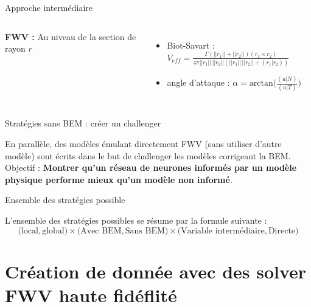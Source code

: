 \documentclass[
11pt,notheorems,hyperref={pdfauthor=whatever}
]{beamer}
\begin{document}
\begin{frame}{Approche intermédiaire}
\begin{center}
\begin{columns}[c]
        \centering

        \textbf{FWV :}
        Au niveau de la section de rayon $r$ 
        \begin{itemize}\small
            \item Biot-Savart :  $V_{eff} = \frac{\Gamma(||r_1|| + ||r_2||)(r_1 \times r_2)}{4\pi ||r_1|| \, ||r_2||(||r_1||\,||r_2|| + (r_1 | r_2))}$
            \item angle d'attaque :  $\alpha = \text{arctan}\bigl(\frac{(u|N)}{(u|T)}\bigr)$
        \end{itemize}
    \end{columns}    
    \end{center}
\end{frame}

\begin{frame}{Stratégies sans BEM : créer un challenger}
    \begin{center}
    En parallèle, des modèles émulant directement FWV (sans utiliser d'autre modèle) sont écrits dans le but de challenger les modèles corrigeant la BEM.\\ 
    Objectif : \textbf{Montrer qu'un réseau de neurones informés par un modèle physique performe mieux qu'un modèle non informé}.
    \end{center}
\end{frame}

\begin{frame}{Ensemble des stratégies possible}
    \begin{center}
        L'ensemble des stratégies possibles se résume par la formule suivante : 
            \[
            \bigl(\text{local}, \text{global}\bigr) \times \bigl(\text{Avec BEM}, \text{Sans BEM}\bigr) \times \bigl(\text{Variable intermédiaire}, \text{Directe}\bigr)
            \]
    \end{center}
\end{frame}

\section{Création de donnée avec des solver FWV haute fidéflité}
   
\end{document}
